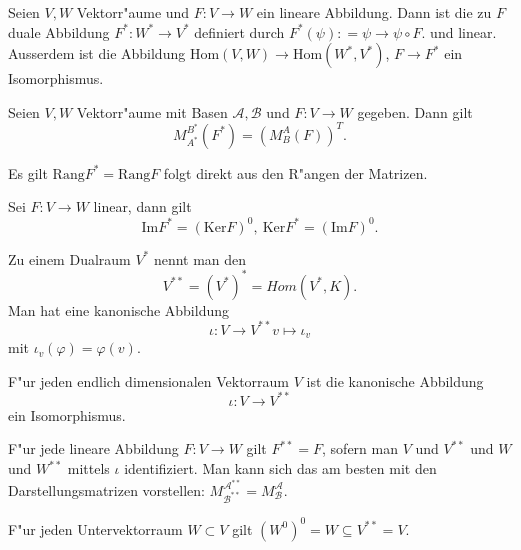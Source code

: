 \documentclass[8pt, a4paper, twocolumn, landscape]{article}
\begin{document}
\begin{definition}
Seien $V, W$ Vektorr"aume und $F : V \rightarrow W$ ein lineare Abbildung. Dann ist die zu $F$ duale Abbildung
$
F^* : W^* \rightarrow V^*
$
definiert durch
$
F^*(\psi) : = \psi \rightarrow \psi \circ F.
$
und linear. Ausserdem ist die Abbildung $\mathrm{Hom}(V, W) \rightarrow \mathrm{Hom} (W^*, V^*)$, $F \rightarrow F^*$ ein Isomorphismus.
\end{definition}
 


\begin{theorem}
 Seien $V, W$ Vektorr"aume mit Basen $\mathcal{A}, \mathcal{B}$ und $F : V \rightarrow W$ gegeben. Dann gilt
$$
 M^{B^*}_{A^*}(F^*) = \left(M^{A}_B(F)\right)^T.
$$
\end{theorem}

\begin{corollary}
Es gilt $\mathrm{Rang}F^* = \mathrm{Rang}F$ folgt direkt aus den R"angen der Matrizen.
\end{corollary}

\begin{theorem}
Sei $F : V \rightarrow W$ linear, dann gilt 
$$
\mathrm{Im}F^* = \left( \mathrm{Ker} F \right)^0, \ \mathrm{Ker}F^* = \left( \mathrm{Im} F \right)^0.
$$
\end{theorem}


\begin{definition}
Zu einem Dualraum $V^*$ nennt man den 
$$
V ^{**} = (V^*)^* = Hom(V^*, K).
$$
Man hat eine kanonische Abbildung 
$$
\iota : V \rightarrow V^{**}
v \mapsto \iota_v
$$
mit $\iota_v(\varphi) = \varphi (v)$.
\end{definition}

\begin{theorem}
F"ur jeden endlich dimensionalen Vektorraum $V$ ist die kanonische Abbildung
$$
\iota : V \rightarrow V^{**}
$$
ein Isomorphismus.
\end{theorem}

\begin{corollary}
F"ur jede lineare Abbildung $F : V \rightarrow W$ gilt $F^{**} = F$, sofern man $V$ und $V^{**}$ und $W$ und $W^{**}$ mittels $\iota$ identifiziert. Man kann sich das am besten mit den Darstellungsmatrizen vorstellen: $M^{\mathcal{A}^{**}}_{\mathcal{B}^{**}} = M^\mathcal{A}_\mathcal{B}$.
\end{corollary}

\begin{remark}
F"ur jeden Untervektorraum $W \subset V$ gilt $(W^0)^0 = W \subseteq V^{**} = V$.
\end{remark}
\end{document}
